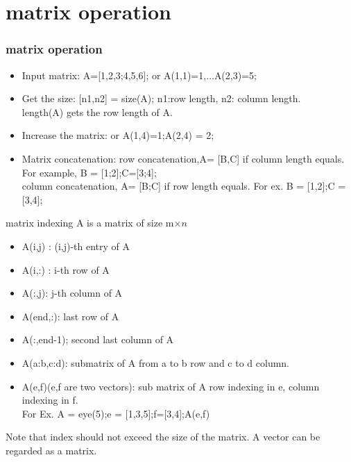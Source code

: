 \documentclass[aspectratio=169]{beamer}
\begin{document}
 \section{matrix operation}
 \begin{frame}
   \frametitle{matrix operation}
   \begin{itemize}
     \item Input matrix: A=[1,2,3;4,5,6]; or A(1,1)=1,$\ldots$A(2,3)=5;
     \item Get the size: [n1,n2] = size(A);
          {\small \color{blue} n1:row length, n2:  column length.}\\
           length(A)  gets the row length of A.
     \item Increase the matrix: 
           or A(1,4)=1;A(2,4) = 2;
     \item Matrix concatenation: row concatenation,A= [B,C] if column length equals. For example, B = [1;2];C=[3;4];\\
           column concatenation, A= [B;C] if row length equals. For ex. B = [1,2];C = [3,4];
   \end{itemize}
 \end{frame}
 \begin{frame}{matrix indexing}
   A is a matrix of size m$\times n$
   \begin{itemize}
     \item A(i,j) : (i,j)-th entry of A
     \item A(i,:) : i-th row of A
     \item A(:,j): j-th column of A
     \item A(end,:): last row of A
           \item A(:,end-1); second last column of A
     \item A(a:b,c:d): submatrix of A from a to b row and c to d column.
           
     \item A(e,f)(e,f are two vectors): sub matrix of A row indexing in e, column indexing in f.\\
           For Ex.
           A = eye(5);e = [1,3,5];f=[3,4];A(e,f)
   \end{itemize}
   Note that index should not exceed the size of the matrix. A vector can be regarded as a matrix.
 \end{frame}
\end{document}
